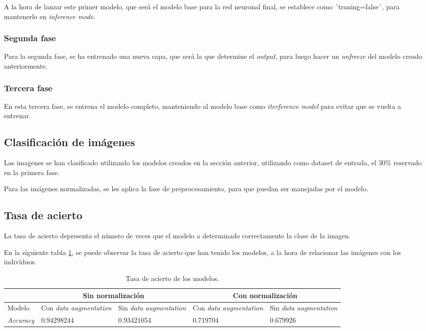 A la hora de lanzar este primer modelo, que será el modelo base para la red neuronal final, se establece como  ´traning=false´, para mantenerlo en \textit{inference mode}.


\subsubsection{Segunda fase}

Para la segunda fase, se ha entrenado una nueva capa, que será la que determine el \textit{output}, para luego hacer un \textit{unfreeze} del modelo creado anteriormente.

\subsubsection{Tercera fase}

En esta tercera fase, se entrena el modelo completo, manteniendo al modelo base como \textit{iterference model} para evitar que se vuelta a entrenar.


\subsection{Clasificación de imágenes}

Las imagenes se han clasificado utilizando los modelos creados en la sección anterior, utilizando como dataset de entrada, el 30\% reservado en la primera fase. 

Para las imágenes normalizadas, se les aplica la fase de preprocesamiento, para que puedan ser manejadas por el modelo. 

\subsection{Tasa de acierto} 

La tasa de acierto depresenta el número de veces que el modelo a determinado correctamente la clase de la imagen. 

En la siguiente tabla \ref{tabla:tasa-acierto-modelos}, se puede observar la tasa de acierto que han tenido los modelos, a la hora de relacionar las imágenes
 con los indivíduos.

\begin{table}[h!]
\begin{tabular}{ |p{2cm}||p{2cm}|p{2cm}|p{2cm}|p{2cm}|  }
    \hline
     & \multicolumn{2}{|c|}{Sin normalización} & \multicolumn{2}{|c|}{Con normalización} \\
    \hline
    Modelo& Con \textit{data augmentation} & Sin \textit{data augmentation} &Con \textit{data augmentation}&Sin \textit{data augmentation}\\
    \hline
    \textit{Accuracy} & 0.94298244   & 0.93421054    & 0.719704 &   0.679926\\
    \hline
   \end{tabular}
   \caption{\label{tabla:tasa-acierto-modelos}Tasa de acierto de los modelos.}
\end{table}


